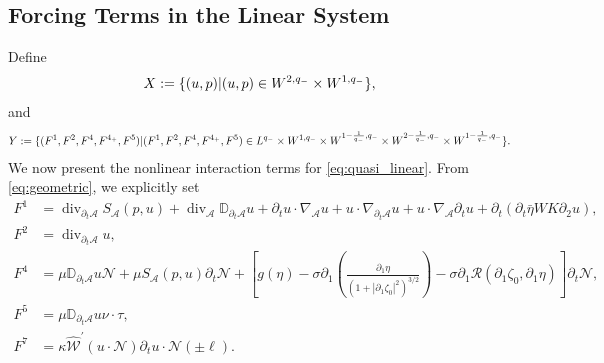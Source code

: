 \documentclass[letterpaper,reqno,10pt,twoside]{amsart}
\makeatletter
\renewcommand \theequation {%
	\ifnum \c@section>\z@ \@arabic\c@section.%
	\fi\@arabic\c@equation} \@addtoreset{equation}{section}
\theoremstyle{definition}
\theoremstyle{remark}
\def\p{\partial}
\makeatother
\begin{document}
		
		\begin{appendix}
			
			
			\makeatletter
			\renewcommand \theequation {%
				A.%
				\@arabic\c@equation} 
			\makeatother
			
			
			
			\section{Forcing Terms in the Linear System}\label{sec:dive_forcing}
			
			
			Define
			\begin{align}{\label{eq:def1}}
				X:=\{(u,p)|(u,p)\in W^{2,q_{-}}\times W^{1,q_{-}}\},
			\end{align}
			and
			\begin{align}{\label{eq:def2}}
				Y:=\{(F^{1},F^{2},F^{4},F^{4_{+}},F^{5})|(F^{1},F^{2},F^{4},F^{4_{+}},F^{5})\in L^{q_{-}}\times W^{1,q_{-}}\times W^{1-\frac{1}{q_{-}},q_{-}}\times W^{2-\frac{1}{q_{-}},q_{-}}\times W^{1-\frac{
						1
					}{q_{-}},q_{-}}\}.
			\end{align}
			We now present the nonlinear interaction terms for \eqref{eq:quasi_linear}. From \eqref{eq:geometric}, we explicitly set
			\[
			\begin{aligned}
				F^{1}&=\operatorname{div}_{\partial_{t}\mathcal{A}}S_{\mathcal{A}}(p,u)
				+\operatorname{div}_{\mathcal{A}}\mathbb{D}_{\partial_{t}\mathcal{A}}u+\partial_{t}u\cdot \nabla_{\mathcal{A}}u+u\cdot \nabla_{\partial_{t}\mathcal{A}}u+u\cdot \nabla_{\mathcal{A}}\partial_{t}u+\partial_{t}(\partial_{t}\bar{\eta}WK\partial_{2}u),\\F^{2}&=\operatorname{div}_{\partial_{t}\mathcal{A}}u,\\
				F^{4}&=\mu\mathbb{D}_{\partial_{t}\mathcal{A}}u\mathcal{N}+\mu S_{\mathcal{A}}(p,u)\partial_{t}\mathcal{N}+\left[g(\eta)-\sigma\p_1\left(\frac{\p_1\eta}{(1+|\p_1\zeta_0|^2)^{3/2}}\right)-\sigma\partial_{1}\mathcal{R}(\partial_{1}\zeta_{0},\partial_{1}\eta)\right]\p_t\mathcal{N},\\
				F^{5}&=\mu\mathbb{D}_{\p_t\mathcal{A}}u\nu\cdot\tau ,\\
				F^{7}&=\kappa\hat{\mathscr{W}}^\prime(u\cdot \mathcal{N})\p_tu\cdot \mathcal{N}(\pm\ell).
			\end{aligned}
			\]
			

\end{appendix}
\end{document}
